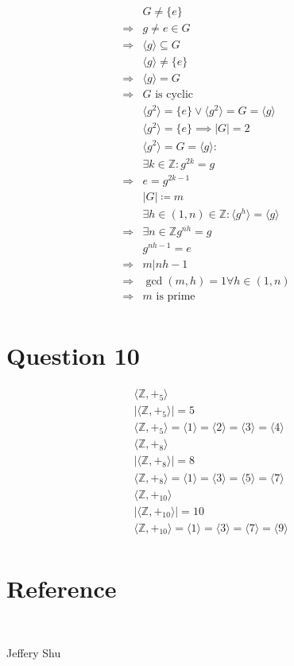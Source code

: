 \documentclass{article}
\begin{document}
\begin{equation*}
    \begin{split}
        &G\ne\{e\}\\
        \Rightarrow&g\ne e\in G\\
        \Rightarrow&\langle g\rangle\subseteq G\\
        &\langle g\rangle\ne\{e\}\\
        \Rightarrow&\langle g\rangle=G\\
        \Rightarrow&G\text{ is cyclic}\\
        &\langle g^2\rangle =\{e\}\lor \langle g^2\rangle =G=\langle g\rangle\\
        &\langle g^2\rangle =\{e\}\implies |G|=2\\
        &\langle g^2\rangle =G=\langle g\rangle:\\
        &\exists k\in \mathbb{Z} :g^{2k}=g\\
        \Rightarrow&e=g^{2k-1}\\
        &|G|\coloneqq m\\
        &\exists h\in(1,n)\in\mathbb{Z} :\langle g^h\rangle=\langle g\rangle\\
        \Rightarrow&\exists n\in\mathbb{Z} g^{nh}=g\\
        &g^{nh-1}=e\\
        \Rightarrow&m|nh-1\\
        \Rightarrow&\gcd(m,h)=1\forall h\in(1,n)\\
        \Rightarrow&m\text{ is prime}\\
    \end{split}
\end{equation*}

\newpage

\section*{Question 10}

\begin{equation*}
    \begin{split}
        &\langle\mathbb{Z},+_5\rangle\\
        &|\langle\mathbb{Z},+_5\rangle|=5\\
        &\langle\mathbb{Z} ,+_5\rangle=\langle1\rangle=\langle2\rangle=\langle3\rangle=\langle4\rangle\\
        &\langle\mathbb{Z} ,+_8\rangle\\
        &|\langle\mathbb{Z} ,+_8\rangle|=8\\
        &\langle\mathbb{Z} ,+_8\rangle=\langle1\rangle=\langle3\rangle=\langle5\rangle=\langle7\rangle\\
        &\langle\mathbb{Z} ,+_{10}\rangle\\
        &|\langle\mathbb{Z} ,+_{10}\rangle|=10\\
        &\langle\mathbb{Z} ,+_{10}\rangle=\langle1\rangle=\langle3\rangle=\langle7\rangle=\langle9\rangle\\
    \end{split}
\end{equation*}

\newpage

\section*{Reference}

~

Jeffery Shu
\end{document}
